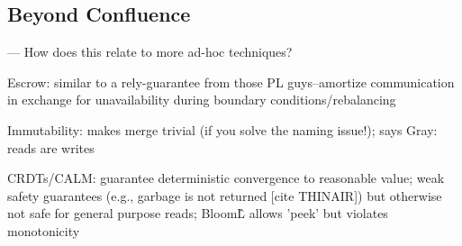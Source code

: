 \subsection{Beyond Confluence}

--- How does this relate to more ad-hoc techniques?

Escrow: similar to a rely-guarantee from those PL guys--amortize
communication in exchange for unavailability during boundary
conditions/rebalancing

Immutability: makes merge trivial (if you solve the naming issue!);
says Gray: reads are writes

CRDTs/CALM: guarantee deterministic convergence to reasonable value;
weak safety guarantees (e.g., garbage is not returned [cite THINAIR])
but otherwise not safe for general purpose reads; Bloom\^L allows
'peek' but violates monotonicity
